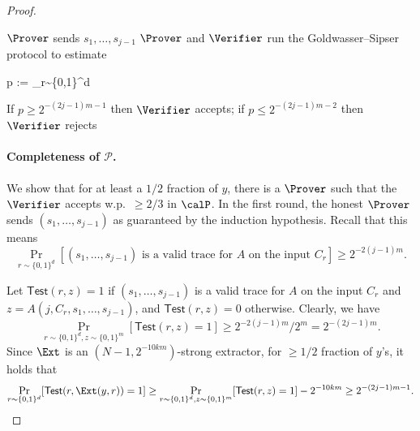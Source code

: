 \begin{proof}
\begin{algorithm2e}[H]
      \caption{The $\AM/_{O(\log k)}$ protocol $\mathcal{P}$ breaking demi-bits generator $G$} 
      \label{alg:am}
	
    	$\Prover$ sends $s_1,\dots,s_{j-1}$\label{line: prover sends s}\; 
        $\Prover$ and $\Verifier$ run the Goldwasser--Sipser protocol to estimate\label{line: prover and verifier runs Goldwasser Sipser}
        \begin{algomathdisplay}
            p := \Pr_{r\sim \{0,1\}^d}\left[\begin{aligned}
                &(s_1, \dots, s_{j-1})\text{ is a valid trace for $A$ on the input $C_r$}\\
                \text{and }&\Ext(y, r) = A(j, C_r, s_1, \dots, s_{j-1}).
            \end{aligned}\right]
        \end{algomathdisplay}
    	If $p \ge 2^{-(2j-1)m-1}$ then $\Verifier$ accepts; if $p \le 2^{-(2j-1)m-2}$ then $\Verifier$ rejects\;
\end{algorithm2e} 


\paragraph{Completeness of $\mathcal{P}$.} We show that for at least a $1/2$ fraction of $y$, there is a $\Prover$ such that the $\Verifier$ accepts w.p.~$\ge 2/3$ in $\calP$. In the first round, the honest $\Prover$ sends $(s_1, \dots, s_{j-1})$ as guaranteed by the induction hypothesis. Recall that this means
\[\Pr_{r\sim \{0,1\}^d}[(s_1, \dots, s_{j-1})\text{ is a valid trace for $A$ on the input $C_r$}] \ge 2^{-2(j-1)m}.\]

Let $\mathsf{Test}(r, z) = 1$ if $(s_1, \dots, s_{j-1})$ is a valid trace for $A$ on the input $C_r$ and $z = A(j, C_r, s_1, \dots, s_{j-1})$, and $\mathsf{Test}(r, z) = 0$ otherwise. Clearly, we have
\[\Pr_{r\sim \{0,1\}^d, z\sim \{0,1\}^m}[\mathsf{Test}(r, z) = 1] \ge 2^{-2(j-1)m} / 2^m = 2^{-(2j-1)m}.\]
Since $\Ext$ is an $(N-1,2^{-10km})$-strong extractor, for $\ge 1/2$ fraction of $y$'s, it holds that 
\[\Pr_{r\sim \{0,1\}^d}[\mathsf{Test}(r, \Ext(y, r)) = 1] \ge \Pr_{r\sim \{0,1\}^d,z\sim \{0,1\}^m}[\mathsf{Test}(r,z) = 1] - 2^{-10km}\ge 2^{-(2j-1)m-1}.\]


\end{proof}
